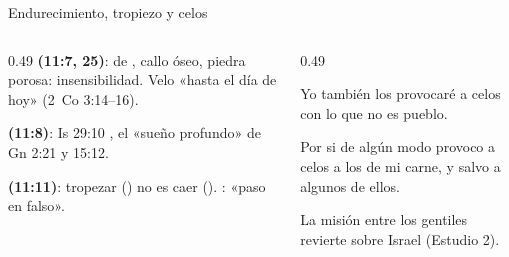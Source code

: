 \begin{frame}{Endurecimiento, tropiezo y celos}
\begin{columns}[T,onlytextwidth]
\begin{column}{0.49\textwidth}\small\RaggedRight
\textbf{\textcolor{cafe}{} (11:7, 25)}: de , callo óseo, piedra porosa: insensibilidad. Velo «hasta el día de hoy» (2~Co 3:14--16).\par\smallskip
\textbf{\textcolor{cafe}{} (11:8)}: Is 29:10 , el «sueño profundo» de Gn 2:21 y 15:12.\par\smallskip
\textbf{\textcolor{cafe}{} (11:11)}: tropezar () no es caer (). : «paso en falso».
\end{column}
\begin{column}{0.49\textwidth}
\par\smallskip
\begin{cita}[fontupper=\scriptsize\itshape]Yo también los provocaré a celos con lo que no es pueblo.\end{cita}
\begin{cita}[fontupper=\scriptsize\itshape]Por si de algún modo provoco a celos a los de mi carne, y salvo a algunos de ellos.\end{cita}
\scriptsize La misión entre los gentiles revierte sobre Israel (Estudio 2).
\end{column}
\end{columns}
\end{frame}


